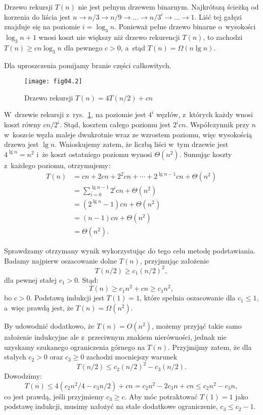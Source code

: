 \exercise %
Drzewo rekursji $T(n)$ nie jest pełnym drzewem binarnym. Najkrótszą ścieżką od korzenia do liścia jest $n\to n/3\to n/9\to\dots\to n/3^i\to\dots\to1$. Liść tej gałęzi znajduje się na poziomie $i=\log_3n$. Ponieważ pełne drzewo binarne o~wysokości $\log_3n+1$ wnosi koszt nie większy niż drzewo rekurencji $T(n)$, to zachodzi $T(n)\ge cn\log_3n$ dla pewnego $c>0$, a~stąd $T(n)=\Omega(n\lg n)$.

\exercise %
Dla uproszczenia pomijamy branie części całkowitych.
\begin{figure}[ht]
	\begin{center}
		\texttt{[image: fig04.2]}
	\end{center}
	\caption{Drzewo rekursji $T(n)=4T(n/2)+cn$} \label{fig:4.2-3}
\end{figure}
W~drzewie rekursji z~rys.~\ref{fig:4.2-3}, na  poziomie jest $4^i$ węzłów, z~których każdy wnosi koszt równy $cn/2^i$. Stąd, kosztem całego poziomu jest $2^icn$. Współczynnik przy $n$ w~koszcie węzła maleje dwukrotnie wraz ze wzrostem poziomu, więc wysokością drzewa jest $\lg n$. Wnioskujemy zatem, że liczbą liści w~tym drzewie jest $4^{\lg n}=n^2$ i~że koszt ostatniego poziomu wynosi $\Theta(n^2)$. Sumując koszty z~każdego poziomu, otrzymujemy:
\begin{align*}
	T(n) &= cn+2cn+2^2cn+\cdots+2^{\lg n-1}cn+\Theta(n^2) \\
	&= \sum_{i=0}^{\lg n-1}2^icn+\Theta(n^2) \\
	&= (2^{\lg n}-1)cn+\Theta(n^2) \\
	&= (n-1)cn+\Theta(n^2) \\
	&= \Theta(n^2).
\end{align*}

Sprawdzamy otrzymany wynik wykorzystując do tego celu metodę podstawiania. Badamy najpierw oszacowanie dolne $T(n)$, przyjmując założenie
\[
	T(n/2) \ge c_1(n/2)^2,
\]
dla pewnej stałej $c_1>0$. Stąd:
\[
	T(n) \ge c_1n^2+cn \ge c_1n^2,
\]
bo $c>0$. Podstawą indukcji jest $T(1)=1$, które spełnia oszacowanie dla $c_1\le1$, a~więc prawdą jest, że $T(n)=\Omega(n^2)$.

By udowodnić dodatkowo, że $T(n)=O(n^2)$, możemy przyjąć takie samo założenie indukcyjne ale z~przeciwnym znakiem nierówności, jednak nie uzyskamy szukanego ograniczenia górnego na $T(n)$. Przyjmijmy zatem, że dla stałych $c_2>0$ oraz $c_3\ge0$ zachodzi mocniejszy warunek
\[
	T(n/2) \le c_2(n/2)^2-c_3(n/2).
\]
Dowodzimy:
\[
	T(n) \le 4(c_2n^2\!/4-c_3n/2)+cn = c_2n^2-2c_3n+cn \le c_2n^2-c_3n,
\]
co jest prawdą, jeśli przyjmiemy $c_3\ge c$. Aby móc potraktować $T(1)=1$ jako podstawę indukcji, musimy nałożyć na stałe dodatkowe ograniczenie, $c_3\le c_2-1$.

